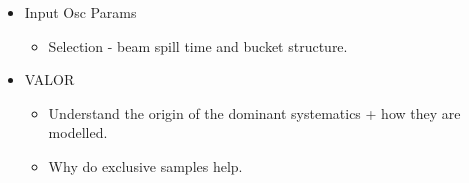 \begin{itemize}
    \item Input Osc Params
    \begin{itemize}
        \item Selection - beam spill time and bucket structure.
    \end{itemize}
    
    \item VALOR
    \begin{itemize}
        \item Understand the origin of the dominant systematics + how they are modelled. 
        \item Why do exclusive samples help. 
    \end{itemize}
\end{itemize}